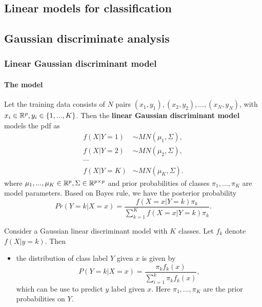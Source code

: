 \begin{refsection}
\startcontents[chapters]	
	\chapter{Linear models for classification}\label{ch:StatisticalLearning-linear-models}


\section{Gaussian discriminate analysis}





\subsection{Linear Gaussian discriminant model}
\subsubsection{The model}
\begin{definition}\cite[139]{james2013introduction}
	Let the training data consists of $N$ pairs $(x_1,y_1),(x_2,y_2),...,(x_N,y_N)$, with $x_i \in \mathbb{R}^p, y_i \in \{1,...,K\}$. Then the \textbf{linear Gaussian discriminant model} models the pdf as
	\begin{align*}
	f(X|Y=1)&\sim MN(\mu_1,\Sigma),\\
	f(X|Y=2)& \sim MN(\mu_2,\Sigma),\\
	\cdots & \\
	f(X|Y=K)& \sim MN(\mu_K,\Sigma).
	\end{align*}
	where $\mu_1,...,\mu_K\in \mathbb{R}^p, \Sigma\in \mathbb{R}^{p\times p}$ and prior probabilities of classes $\pi_1,...,\pi_K$ are model parameters.
	Based on Bayes rule, we have the posterior probability
	$$Pr(Y = k|X=x) = \frac{f(X=x|Y=k)\pi_k}{\sum_{k=1}^K f(X=x|Y=k)\pi_k}.$$
\end{definition}




\begin{lemma}\cite[106]{murphy2012machine}
	Consider a Gaussian linear discriminant model with $K$ classes. Let $f_k$ denote $f(X|y=k)$. Then
	\begin{itemize}
		\item the distribution of class label $Y$ given $x$ is given by
		$$P(Y=k|X=x) = \frac{\pi_k f_k(x)}{\sum_{i=1}^{k}\pi_k f_k(x)},$$
		which can be use to predict $y$ label given $x$. Here $\pi_1,...,\pi_K$ are the prior probabilities on $Y$. 
	\end{itemize}	
\end{lemma}




\end{refsection}
